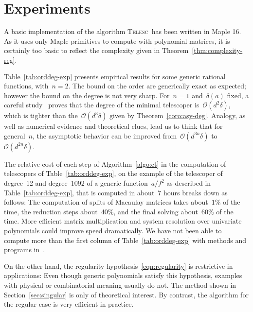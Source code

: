 \documentclass{sig-alternate}
\newcommand{\tCreatTel}{\textsc{Telesc}}
\newcommand{\bigO}{{\mathcal{O}}}
\begin{document}
\section{Experiments}



\noindent A basic implementation of the algorithm \tCreatTel\ has been written in Maple 16.
As it uses only Maple primitives to compute with polynomial matrices, it is certainly too basic to reflect the complexity given in Theorem~\ref{thm:complexity-reg}.

Table~\ref{tab:orddeg-exp} presents empirical results for some generic rational functions, with~$n=2$. 
The bound on the order are generically exact as expected;
however the bound on the degree is not very sharp.
For~$n=1$ and~$\delta(a)$ fixed, a careful study~\cite{BosCheChy10} proves that the degree of the minimal telescoper is~$\bigO(d^2\delta)$, which is tighter than the~$\bigO(d^3\delta)$ given by Theorem~\ref{coro:asy-deg}.
Analogy, as well as numerical evidence and theoretical clues, lead us to think that for general~$n$, the asymptotic behavior can be improved from~$\bigO(d^{3n}\delta)$ to~$\bigO(d^{2n}\delta)$.

The relative cost of each step of Algorithm~\ref{algo:ct} in the computation of telescopers of Table~\ref{tab:orddeg-exp}, on the example of the telescoper of degree~12 and degree~1092 of a generic function~$a/f^2$ as described in Table~\ref{tab:orddeg-exp}, that is computed in about~7 hours breaks down as follows:
The computation of splits of Macaulay matrices takes about~1\% of the time, the reduction steps about~40\%, and the final solving  about~60\% of the time.
More efficient matrix multiplication and system resolution over univariate polynomials could improve speed dramatically.
We have not been able to compute more than the first column of Table~\ref{tab:orddeg-exp} with methods and programs in~\cite{Kou10,CheKauSin12}.

On the other hand, the regularity hypothesis~\eqref{eqn:regularity} is restrictive in applications:
Even though generic polynomials satisfy this hypothesis, examples with physical or combinatorial meaning usually do not.
The method shown in Section~\ref{sec:singular} is only of theoretical interest.
By contrast, the algorithm for the regular case is very efficient in practice.


\scriptsize


\end{document}
